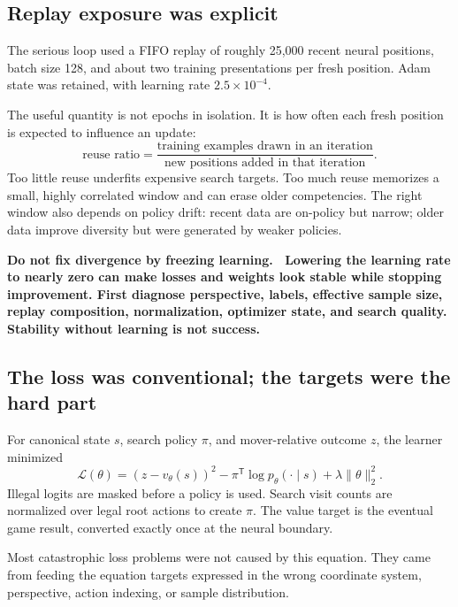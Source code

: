 \documentclass[10.5pt,letterpaper]{article}
\newcommand{\boxtitle}[1]{\sffamily\bfseries\color{deepblue}#1.\ }
\begin{document}
\subsection{Replay exposure was explicit}

The serious loop used a FIFO replay of roughly 25,000 recent neural positions,
batch size 128, and about two training presentations per fresh position. Adam
state was retained, with learning rate $2.5\times10^{-4}$.

The useful quantity is not epochs in isolation. It is how often each fresh
position is expected to influence an update:
\[
  \text{reuse ratio}
  =
  \frac{\text{training examples drawn in an iteration}}
       {\text{new positions added in that iteration}}.
\]
Too little reuse underfits expensive search targets. Too much reuse memorizes a
small, highly correlated window and can erase older competencies. The right
window also depends on policy drift: recent data are on-policy but narrow;
older data improve diversity but were generated by weaker policies.

\begin{warningbox}
\boxtitle{Do not fix divergence by freezing learning}
Lowering the learning rate to nearly zero can make losses and weights look
stable while stopping improvement. First diagnose perspective, labels,
effective sample size, replay composition, normalization, optimizer state, and
search quality. Stability without learning is not success.
\end{warningbox}

\subsection{The loss was conventional; the targets were the hard part}

For canonical state $s$, search policy $\pi$, and mover-relative outcome $z$,
the learner minimized
\[
  \mathcal{L}(\theta)
  =
  (z-v_\theta(s))^2
  -
  \pi^\mathsf{T}\log p_\theta(\cdot\mid s)
  +
  \lambda\lVert\theta\rVert_2^2.
\]
Illegal logits are masked before a policy is used. Search visit counts are
normalized over legal root actions to create $\pi$. The value target is the
eventual game result, converted exactly once at the neural boundary.

Most catastrophic loss problems were not caused by this equation. They came
from feeding the equation targets expressed in the wrong coordinate system,
perspective, action indexing, or sample distribution.
\end{document}
